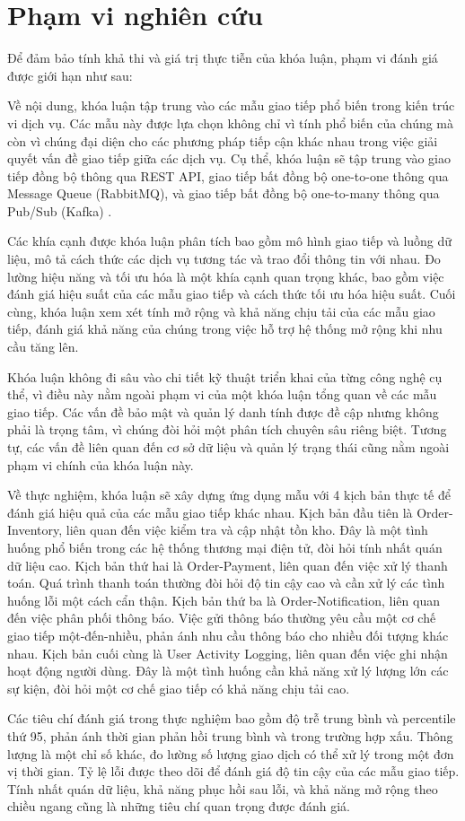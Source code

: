\section{Phạm vi nghiên cứu}
Để đảm bảo tính khả thi và giá trị thực tiễn của khóa luận, phạm vi đánh giá được giới hạn như sau:

Về nội dung, khóa luận tập trung vào các mẫu giao tiếp phổ biến trong kiến trúc vi dịch vụ. Các mẫu này được lựa chọn không chỉ vì tính phổ biến của chúng mà còn vì chúng đại diện cho các phương pháp tiếp cận khác nhau trong việc giải quyết vấn đề giao tiếp giữa các dịch vụ. Cụ thể, khóa luận sẽ tập trung vào giao tiếp đồng bộ thông qua REST API, giao tiếp bất đồng bộ one-to-one thông qua Message Queue (RabbitMQ), và giao tiếp bất đồng bộ one-to-many thông qua Pub/Sub (Kafka) \cite{aksakalli2021}.

Các khía cạnh được khóa luận phân tích bao gồm mô hình giao tiếp và luồng dữ liệu, mô tả cách thức các dịch vụ tương tác và trao đổi thông tin với nhau. Đo lường hiệu năng và tối ưu hóa là một khía cạnh quan trọng khác, bao gồm việc đánh giá hiệu suất của các mẫu giao tiếp và cách thức tối ưu hóa hiệu suất. Cuối cùng, khóa luận xem xét tính mở rộng và khả năng chịu tải của các mẫu giao tiếp, đánh giá khả năng của chúng trong việc hỗ trợ hệ thống mở rộng khi nhu cầu tăng lên.

Khóa luận không đi sâu vào chi tiết kỹ thuật triển khai của từng công nghệ cụ thể, vì điều này nằm ngoài phạm vi của một khóa luận tổng quan về các mẫu giao tiếp. Các vấn đề bảo mật và quản lý danh tính được đề cập nhưng không phải là trọng tâm, vì chúng đòi hỏi một phân tích chuyên sâu riêng biệt. Tương tự, các vấn đề liên quan đến cơ sở dữ liệu và quản lý trạng thái cũng nằm ngoài phạm vi chính của khóa luận này.

Về thực nghiệm, khóa luận sẽ xây dựng ứng dụng mẫu với 4 kịch bản thực tế để đánh giá hiệu quả của các mẫu giao tiếp khác nhau. Kịch bản đầu tiên là Order-Inventory, liên quan đến việc kiểm tra và cập nhật tồn kho. Đây là một tình huống phổ biến trong các hệ thống thương mại điện tử, đòi hỏi tính nhất quán dữ liệu cao. Kịch bản thứ hai là Order-Payment, liên quan đến việc xử lý thanh toán. Quá trình thanh toán thường đòi hỏi độ tin cậy cao và cần xử lý các tình huống lỗi một cách cẩn thận. Kịch bản thứ ba là Order-Notification, liên quan đến việc phân phối thông báo. Việc gửi thông báo thường yêu cầu một cơ chế giao tiếp một-đến-nhiều, phản ánh nhu cầu thông báo cho nhiều đối tượng khác nhau. Kịch bản cuối cùng là User Activity Logging, liên quan đến việc ghi nhận hoạt động người dùng. Đây là một tình huống cần khả năng xử lý lượng lớn các sự kiện, đòi hỏi một cơ chế giao tiếp có khả năng chịu tải cao.

Các tiêu chí đánh giá trong thực nghiệm bao gồm độ trễ trung bình và percentile thứ 95, phản ánh thời gian phản hồi trung bình và trong trường hợp xấu. Thông lượng là một chỉ số khác, đo lường số lượng giao dịch có thể xử lý trong một đơn vị thời gian. Tỷ lệ lỗi được theo dõi để đánh giá độ tin cậy của các mẫu giao tiếp. Tính nhất quán dữ liệu, khả năng phục hồi sau lỗi, và khả năng mở rộng theo chiều ngang cũng là những tiêu chí quan trọng được đánh giá. 